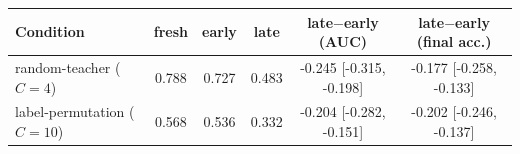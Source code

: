 \begin{tabular}{lccccc}
\toprule
Condition & fresh & early & late & late$-$early (AUC) & late$-$early (final acc.) \\
\midrule
random-teacher ($C{=}4$) & 0.788 & 0.727 & 0.483 & -0.245 [-0.315, -0.198] & -0.177 [-0.258, -0.133] \\
label-permutation ($C{=}10$) & 0.568 & 0.536 & 0.332 & -0.204 [-0.282, -0.151] & -0.202 [-0.246, -0.137] \\
\bottomrule
\end{tabular}
